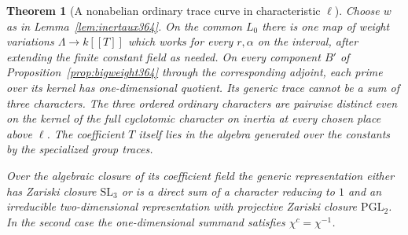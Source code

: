 \documentclass[a4paper,11pt]{article}
\newtheorem{theorem}[proposition]{Theorem}
\theoremstyle{definition}
\theoremstyle{remark}
\numberwithin{equation}{section}
\begin{document}
\begin{theorem}[A nonabelian ordinary trace curve in characteristic \(\ell\)]
\label{thm:rescurve364}
Choose \(w\) as in Lemma~\ref{lem:inertaux364}. On the common
\(L_0\) there is one map of weight variations
\(\Lambda\to k[[T]]\) which works for every \(r,\alpha\) on
the interval, after extending the finite constant field as
needed. On every component \(B'\) of
Proposition~\ref{prop:bigweight364} through the corresponding
adjoint, each prime over its kernel has one-dimensional
quotient. Its generic trace cannot be a sum of three
characters. The three ordered ordinary characters are
pairwise distinct even on the kernel of the full cyclotomic
character on inertia at every chosen place above \(\ell\).
The coefficient \(T\) itself lies in
the algebra generated over the constants by the specialized
group traces.

Over the algebraic closure of its coefficient field the
generic representation either has Zariski closure
\(\mathrm{SL}_3\) or is a
direct sum of a character reducing to \(1\) and an
irreducible two-dimensional representation with projective
Zariski closure \(\mathrm{PGL}_2\). In the second case the
one-dimensional summand satisfies \(\chi^c=\chi^{-1}\).
\end{theorem}
\end{document}
